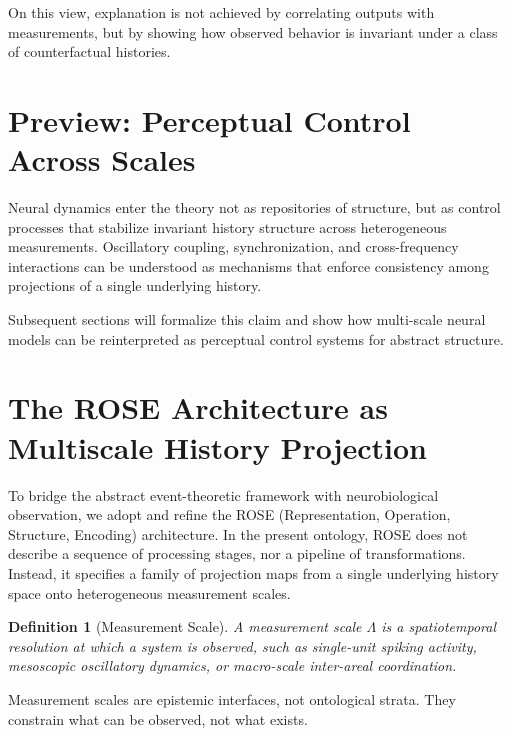 \documentclass[11pt]{article}
\newtheorem{definition}{Definition}
\begin{document}
On this view, explanation is not achieved by correlating outputs with measurements, but by showing how observed behavior is invariant under a class of counterfactual histories.

\section{Preview: Perceptual Control Across Scales}

Neural dynamics enter the theory not as repositories of structure, but as control processes that stabilize invariant history structure across heterogeneous measurements. Oscillatory coupling, synchronization, and cross-frequency interactions can be understood as mechanisms that enforce consistency among projections of a single underlying history.

Subsequent sections will formalize this claim and show how multi-scale neural models can be reinterpreted as perceptual control systems for abstract structure.

\section{The ROSE Architecture as Multiscale History Projection}

To bridge the abstract event-theoretic framework with neurobiological observation, we adopt and refine the ROSE (Representation, Operation, Structure, Encoding) architecture. In the present ontology, ROSE does not describe a sequence of processing stages, nor a pipeline of transformations. Instead, it specifies a family of projection maps from a single underlying history space onto heterogeneous measurement scales.

\begin{definition}[Measurement Scale]
A \emph{measurement scale} $\Lambda$ is a spatiotemporal resolution at which a system is observed, such as single-unit spiking activity, mesoscopic oscillatory dynamics, or macro-scale inter-areal coordination.
\end{definition}

Measurement scales are epistemic interfaces, not ontological strata. They constrain what can be observed, not what exists.
\end{document}
